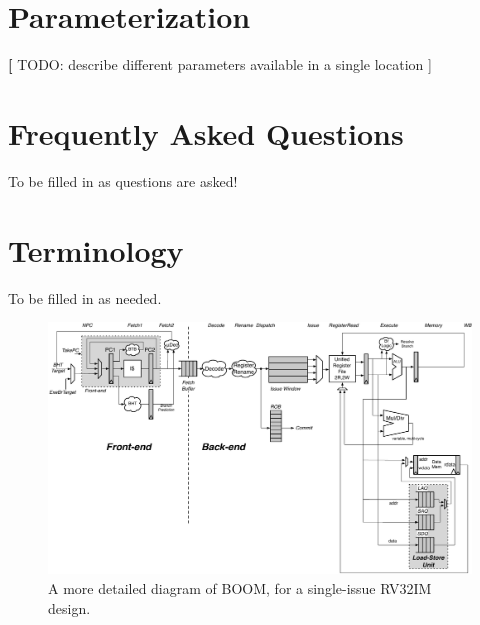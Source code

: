 \documentclass[11pt, notitlepage]{report}
\newcommand{\TODO}[1]{{\color{red} {\textbf [ TODO: #1 ]}}}
\begin{document}
\chapter{Parameterization}
\TODO{describe different parameters available in a single location}

\chapter{Frequently Asked Questions}

To be filled in as questions are asked!


\chapter{Terminology}

To be filled in as needed.



\begin{figure}[ht]
	\centering
	\centerline{\includegraphics[scale =.9, angle=90] {figures/simple_boom_pipeline}}
	\caption{ \small A more detailed diagram of BOOM, for a single-issue RV32IM design.}
	\label{fig:boom-detailed}
\end{figure}








\end{document}
